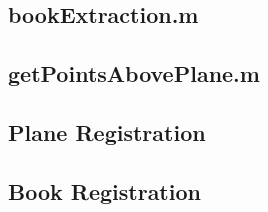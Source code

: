 \subsection{bookExtraction.m}


\subsection{getPointsAbovePlane.m}




\subsection{Plane Registration}



\subsection{Book Registration}
%